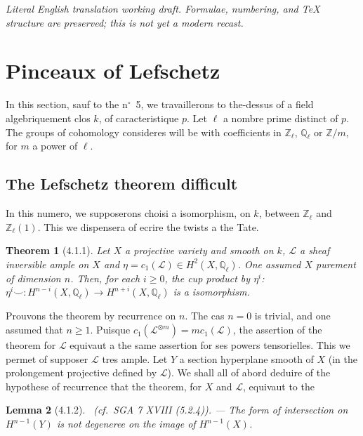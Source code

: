 \documentclass[12pt,a4paper]{article}
\theoremstyle{plain}
\newtheorem{theorem}{Theorem}[section]
\newtheorem{lemma}[theorem]{Lemma}
\theoremstyle{definition}
\theoremstyle{remark}
\newcommand{\bbZ}{\mathbb{Z}}
\newcommand{\scrL}{\mathscr{L}}
\newcommand{\Zl}{\mathbb{Z}_\ell}
\newcommand{\Ql}{\mathbb{Q}_\ell}
\begin{document}
\begin{center}\small\emph{Literal English translation working draft. Formulae, numbering, and TeX structure are preserved; this is not yet a modern recast.}\end{center}
\vspace{0.5em}

\setcounter{section}{3}

\section{Pinceaux of Lefschetz}

In this section, sauf to the n$^\circ$~5, we travaillerons to the-dessus of a field algebriquement clos $k$, of caracteristique $p$. Let $\ell$ a nombre prime distinct of $p$. The groups of cohomology consideres will be with coefficients in $\Zl$, $\Ql$ or $\bbZ/m$, for $m$ a power of $\ell$.

\subsection{The Lefschetz theorem difficult}

In this numero, we supposerons choisi a isomorphism, on $k$, between $\Zl$ and $\Zl(1)$. This we dispensera of ecrire the twists a the Tate.

\begin{theorem}[4.1.1]
Let $X$ a projective variety and smooth on $k$, $\scrL$ a sheaf inversible ample on $X$ and $\eta = c_1(\scrL) \in H^2(X, \Ql)$. One assumed $X$ purement of dimension $n$. Then, for each $i \geq 0$, the cup product by $\eta^i$: $\eta^i \smile : H^{n-i}(X, \Ql) \to H^{n+i}(X, \Ql)$ is a isomorphism.
\end{theorem}

Prouvons the theorem by recurrence on $n$. The cas $n=0$ is trivial, and one assumed that $n \geq 1$. Puisque $c_1(\scrL^{\otimes m}) = m c_1(\scrL)$, the assertion of the theorem for $\scrL$ equivaut a the same assertion for ses powers tensorielles. This we permet of supposer $\scrL$ tres ample. Let $Y$ a section hyperplane smooth of $X$ (in the prolongement projective defined by $\scrL$). We shall all of abord deduire of the hypothese of recurrence that the theorem, for $X$ and $\scrL$, equivaut to the

\begin{lemma}[4.1.2]\ \textup{(cf.~SGA 7 XVIII (5.2.4)).} --- The form of intersection on $H^{n-1}(Y)$ is not degeneree on the image of $H^{n-1}(X)$.
\end{lemma}
\end{document}
